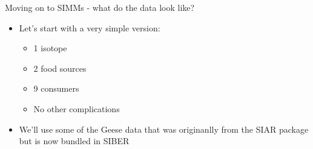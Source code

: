 \documentclass[
  ignorenonframetext,
  aspectratio=169]{beamer}
\providecommand{\tightlist}{%
  \setlength{\itemsep}{0pt}\setlength{\parskip}{0pt}}
\begin{document}
\begin{frame}{Moving on to SIMMs - what do the data look like?}
\protect\hypertarget{moving-on-to-simms---what-do-the-data-look-like}{}
\begin{itemize}
\tightlist
\item
  Let's start with a very simple version:

  \begin{itemize}
  \tightlist
  \item
    1 isotope
  \item
    2 food sources
  \item
    9 consumers
  \item
    No other complications
  \end{itemize}
\item
  We'll use some of the Geese data that was originanlly from the SIAR
  package but is now bundled in SIBER
\end{itemize}
\end{frame}
\end{document}
